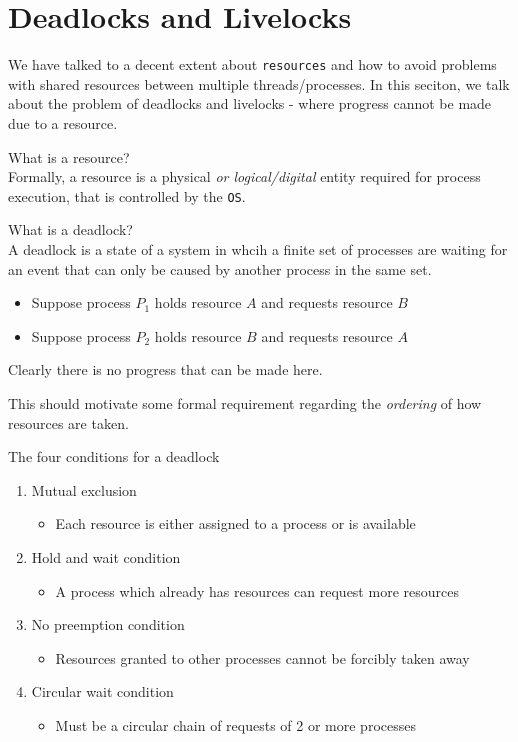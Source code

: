 \documentclass[journal, letterpaper]{IEEEtran}
\begin{document}
\section{Deadlocks and Livelocks}
We have talked to a decent extent about \verb|resources| and how to avoid problems with shared resources between multiple threads/processes. In this seciton, we talk about the problem of deadlocks and livelocks - where progress cannot be made due to a resource.
\begin{theory}{What is a resource?} \\
    Formally, a resource is a physical \textit{or logical/digital} entity required for process execution, that is controlled by the \verb|OS|.
\end{theory}
\begin{theory}{What is a deadlock?} \\
    A deadlock is a state of a system in whcih a finite set of processes are waiting for an event that can only be caused by another process in the same set.
    \begin{itemize}
        \item Suppose process $P_1$ holds resource $A$ and requests resource $B$
        \item Suppose process $P_2$ holds resource $B$ and requests resource $A$
    \end{itemize}
    Clearly there is no progress that can be made here.
\end{theory}
This should motivate some formal requirement regarding the \textit{ordering} of how resources are taken.
\begin{aside}{The four conditions for a deadlock}
    \begin{enumerate}
        \item Mutual exclusion
        \begin{itemize}
            \item Each resource is either assigned to a process or is available
        \end{itemize}
        \item Hold and wait condition
        \begin{itemize}
            \item A process which already has resources can request more resources
        \end{itemize}
        \item No preemption condition
        \begin{itemize}
            \item Resources granted to other processes cannot be forcibly taken away
        \end{itemize}
        \item Circular wait condition
        \begin{itemize}
            \item Must be a circular chain of requests of 2 or more processes
        \end{itemize}
    \end{enumerate}
\end{aside}
\end{document}
